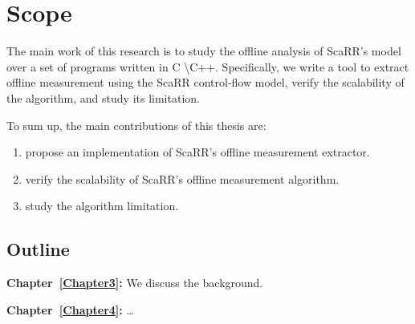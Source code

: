 
\chapter{Scope} %
\label{Chapter2} %

The main work of this research is to study the offline analysis of ScaRR's 
model~\cite{toffaliniScaRRScalableRuntime2019} over a set of programs written 
in C \textbackslash C++. 
Specifically, we write a tool to extract offline measurement using the ScaRR 
control-flow model, verify the scalability of the algorithm, and study its 
limitation.

To sum up, the main contributions of this thesis are:
\begin{enumerate}
	\item propose an implementation of ScaRR's offline measurement extractor.
	\item verify the scalability of ScaRR's offline measurement algorithm.
	\item study the algorithm limitation.
\end{enumerate}

\section{Outline}
\label{sec:outline}


\vspace{0.5cm}
\noindent \textbf{Chapter~\ref{Chapter3}:} We discuss the background.

\vspace{0.5cm}
\noindent \textbf{Chapter~\ref{Chapter4}:} \dots